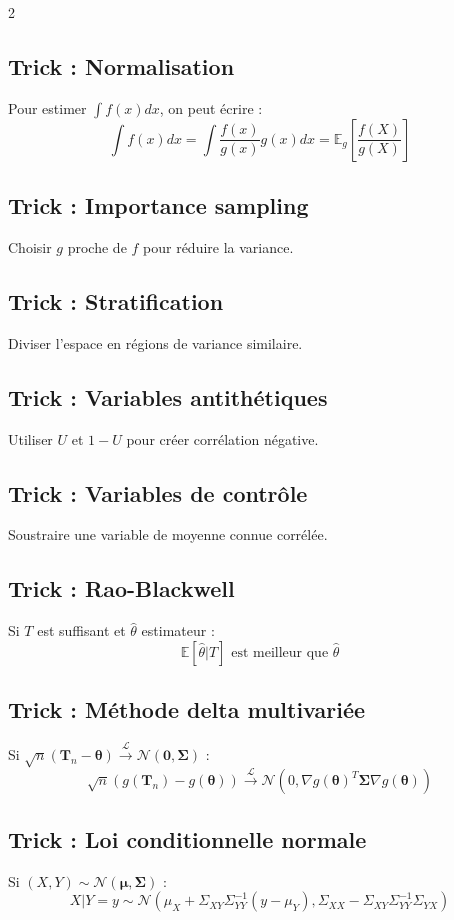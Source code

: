 \documentclass[10pt,a4paper]{article}
\begin{document}
\begin{multicols}{2}
\subsection*{Trick : Normalisation}
Pour estimer $\int f(x) dx$, on peut écrire :
\[
\int f(x) dx = \int \frac{f(x)}{g(x)} g(x) dx = \mathbb{E}_g\left[\frac{f(X)}{g(X)}\right]
\]

\subsection*{Trick : Importance sampling}
Choisir $g$ proche de $f$ pour réduire la variance.

\subsection*{Trick : Stratification}
Diviser l'espace en régions de variance similaire.

\subsection*{Trick : Variables antithétiques}
Utiliser $U$ et $1-U$ pour créer corrélation négative.

\subsection*{Trick : Variables de contrôle}
Soustraire une variable de moyenne connue corrélée.

\subsection*{Trick : Rao-Blackwell}
Si $T$ est suffisant et $\hat{\theta}$ estimateur :
\[
\mathbb{E}[\hat{\theta}|T] \text{ est meilleur que } \hat{\theta}
\]

\subsection*{Trick : Méthode delta multivariée}
Si $\sqrt{n}(\mathbf{T}_n - \boldsymbol{\theta}) \xrightarrow{\mathcal{L}} \mathcal{N}(\mathbf{0}, \boldsymbol{\Sigma})$ :
\[
\sqrt{n}(g(\mathbf{T}_n) - g(\boldsymbol{\theta})) \xrightarrow{\mathcal{L}} \mathcal{N}(0, \nabla g(\boldsymbol{\theta})^T \boldsymbol{\Sigma} \nabla g(\boldsymbol{\theta}))
\]

\subsection*{Trick : Loi conditionnelle normale}
Si $(X, Y) \sim \mathcal{N}(\boldsymbol{\mu}, \boldsymbol{\Sigma})$ :
\[
X|Y = y \sim \mathcal{N}(\mu_X + \Sigma_{XY} \Sigma_{YY}^{-1}(y - \mu_Y), \Sigma_{XX} - \Sigma_{XY} \Sigma_{YY}^{-1} \Sigma_{YX})
\]


\end{multicols}
\end{document}
